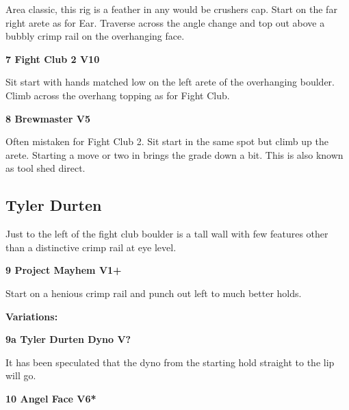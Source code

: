 \begin{multicols}{2}
			\begin{adjustwidth}{0.5cm}{}				
			Area classic, this rig is a feather in any would be crushers cap. Start on the far right arete as for Ear. Traverse across the angle change and top out above a bubbly crimp rail on the overhanging face.
			\end{adjustwidth}

			\label{rt:Fight Club 2}
\colorbox{red!20}{
\parbox{0.95\linewidth}{
\textbf{
7 Fight Club 2 V10  
}
}
}

			\begin{adjustwidth}{0.5cm}{}				
			Sit start with hands matched low on the left arete of the overhanging boulder. Climb across the overhang topping as for Fight Club.
			\end{adjustwidth}
			\label{rt:Brewmaster}
\colorbox{RoyalBlue!20}{
\parbox{0.95\linewidth}{
\textbf{
8 Brewmaster V5  
}
}
}

			\begin{adjustwidth}{0.5cm}{}				
			Often mistaken for Fight Club 2. Sit start in the same spot but climb up the arete. Starting a move or two in brings the grade down a bit. This is also known as tool shed direct.
			\end{adjustwidth}
		\subsection*{Tyler Durten}\label{bf:Tyler Durten}
		Just to the left of the fight club boulder is a tall wall with few features other than a distinctive crimp rail at eye level.\\
	
			\label{rt:Project Mayhem}
\colorbox{green!20}{
\parbox{0.95\linewidth}{
\textbf{
9 Project Mayhem V1+  
}
}
}

			\begin{adjustwidth}{0.5cm}{}				
			Start on a henious crimp rail and punch out left to much better holds.
			\end{adjustwidth}
				\begin{adjustwidth}{0.5cm}{}				
				\textbf{Variations:} \newline
					\label{vr:Tyler Durten Dyno}
\colorbox{black!20}{
\parbox{0.95\linewidth}{
\textbf{
9a Tyler Durten Dyno V?  
}
}
}

					\begin{adjustwidth}{0.5cm}{}				
					It has been speculated that the dyno from the starting hold straight to the lip will go.
					\end{adjustwidth}
				\end{adjustwidth}
			\label{rt:Angel Face}
\colorbox{RoyalBlue!20}{
\parbox{0.95\linewidth}{
\textbf{
10 Angel Face V6*  
}
}
}


\end{multicols}

